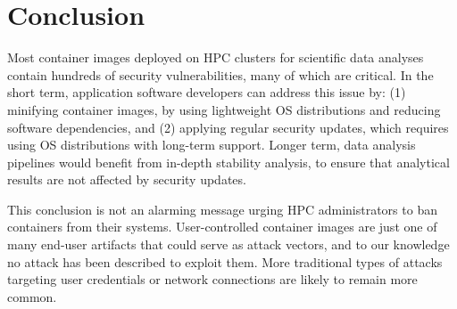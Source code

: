 \documentclass[a4paper,num-refs]{oup-contemporary}
\begin{document}
\section{Conclusion}

Most container images deployed on HPC clusters for scientific data analyses
contain hundreds of security vulnerabilities, many of which are critical.
In the short term, application software developers can address this issue
by: (1) minifying container images, by using lightweight OS distributions
and reducing software dependencies, and (2) applying regular security
updates, which requires using OS distributions with long-term support.
Longer term, data analysis pipelines would benefit from in-depth stability
analysis, to ensure that analytical results are not affected by security
updates.

This conclusion is not an alarming message urging HPC administrators  
to ban containers from their systems. User-controlled container images are
just one of many end-user artifacts that could serve as attack vectors, and
to our knowledge no attack has been described to exploit them. More
traditional types of attacks targeting user credentials or network
connections are likely to remain more common.


\end{document}
